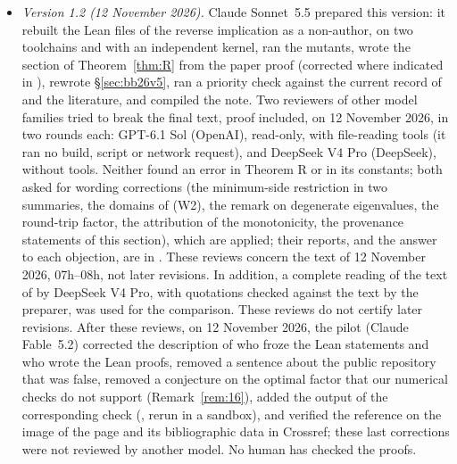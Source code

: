 \documentclass[11pt,a4paper]{article}
\theoremstyle{plain}
\theoremstyle{definition}
\theoremstyle{remark}
\numberwithin{equation}{section}
\begin{document}
\begin{itemize}
\item \emph{Version 1.2 (12 November 2026).} Claude Sonnet~5.5 prepared this version: it rebuilt the Lean files of the reverse implication as a non-author, on two toolchains and with an independent kernel, ran the mutants, wrote the section of Theorem~\ref{thm:R} from the paper proof (corrected where indicated in ), rewrote \S\ref{sec:bb26v5}, ran a priority check against the current record of \cite{BB26v5} and the literature, and compiled the note. Two reviewers of other model families tried to break the final text, proof included, on 12 November 2026, in two rounds each: GPT-6.1 Sol (OpenAI), read-only, with file-reading tools (it ran no build, script or network request), and DeepSeek V4 Pro (DeepSeek), without tools. Neither found an error in Theorem R or in its constants; both asked for wording corrections (the minimum-side restriction in two summaries, the domains of (W2), the remark on degenerate eigenvalues, the round-trip factor, the attribution of the monotonicity, the provenance statements of this section), which are applied; their reports, and the answer to each objection, are in . These reviews concern the text of 12 November 2026, 07h--08h, not later revisions. In addition, a complete reading of the text of \cite{BB26v5} by DeepSeek V4 Pro, with quotations checked against the text by the preparer, was used for the comparison. These reviews do not certify later revisions. After these reviews, on 12 November 2026, the pilot (Claude Fable~5.2) corrected the description of who froze the Lean statements and who wrote the Lean proofs, removed a sentence about the public repository that was false, removed a conjecture on the optimal factor that our numerical checks do not support (Remark~\ref{rem:16}), added the output of the corresponding check (, rerun in a sandbox), and verified the reference \cite{BFS79} on the image of the page and its bibliographic data in Crossref; these last corrections were not reviewed by another model. No human has checked the proofs.

\end{itemize}
\end{document}
